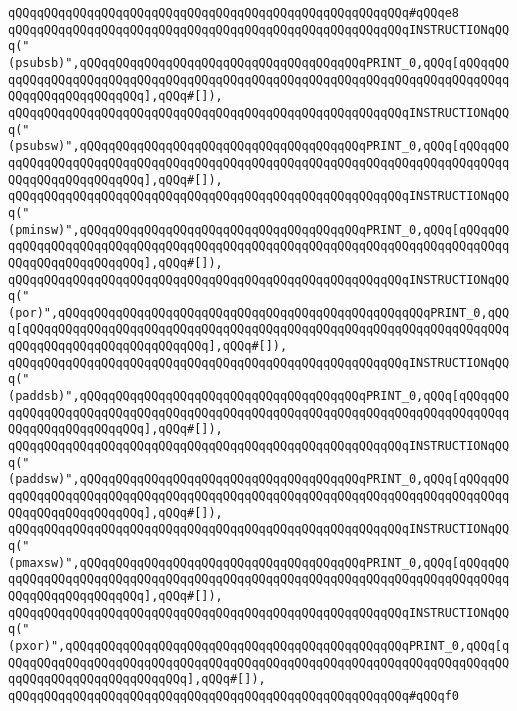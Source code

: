 \verb|qQQqqQQqqQQqqQQqqQQqqQQqqQQqqQQqqQQqqQQqqQQqqQQqqQQqqQQq#qQQqe8|\newline
\verb|qQQqqQQqqQQqqQQqqQQqqQQqqQQqqQQqqQQqqQQqqQQqqQQqqQQqqQQqINSTRUCTIONqQQq("(psubsb)",qQQqqQQqqQQqqQQqqQQqqQQqqQQqqQQqqQQqqQQqPRINT_0,qQQq[qQQqqQQqqQQqqQQqqQQqqQQqqQQqqQQqqQQqqQQqqQQqqQQqqQQqqQQqqQQqqQQqqQQqqQQqqQQqqQQqqQQqqQQqqQQqqQQq],qQQq#[]),|\newline
\verb|qQQqqQQqqQQqqQQqqQQqqQQqqQQqqQQqqQQqqQQqqQQqqQQqqQQqqQQqINSTRUCTIONqQQq("(psubsw)",qQQqqQQqqQQqqQQqqQQqqQQqqQQqqQQqqQQqqQQqPRINT_0,qQQq[qQQqqQQqqQQqqQQqqQQqqQQqqQQqqQQqqQQqqQQqqQQqqQQqqQQqqQQqqQQqqQQqqQQqqQQqqQQqqQQqqQQqqQQqqQQqqQQq],qQQq#[]),|\newline
\verb|qQQqqQQqqQQqqQQqqQQqqQQqqQQqqQQqqQQqqQQqqQQqqQQqqQQqqQQqINSTRUCTIONqQQq("(pminsw)",qQQqqQQqqQQqqQQqqQQqqQQqqQQqqQQqqQQqqQQqPRINT_0,qQQq[qQQqqQQqqQQqqQQqqQQqqQQqqQQqqQQqqQQqqQQqqQQqqQQqqQQqqQQqqQQqqQQqqQQqqQQqqQQqqQQqqQQqqQQqqQQqqQQq],qQQq#[]),|\newline
\verb|qQQqqQQqqQQqqQQqqQQqqQQqqQQqqQQqqQQqqQQqqQQqqQQqqQQqqQQqINSTRUCTIONqQQq("(por)",qQQqqQQqqQQqqQQqqQQqqQQqqQQqqQQqqQQqqQQqqQQqqQQqqQQqPRINT_0,qQQq[qQQqqQQqqQQqqQQqqQQqqQQqqQQqqQQqqQQqqQQqqQQqqQQqqQQqqQQqqQQqqQQqqQQqqQQqqQQqqQQqqQQqqQQqqQQqqQQq],qQQq#[]),|\newline
\verb|qQQqqQQqqQQqqQQqqQQqqQQqqQQqqQQqqQQqqQQqqQQqqQQqqQQqqQQqINSTRUCTIONqQQq("(paddsb)",qQQqqQQqqQQqqQQqqQQqqQQqqQQqqQQqqQQqqQQqPRINT_0,qQQq[qQQqqQQqqQQqqQQqqQQqqQQqqQQqqQQqqQQqqQQqqQQqqQQqqQQqqQQqqQQqqQQqqQQqqQQqqQQqqQQqqQQqqQQqqQQqqQQq],qQQq#[]),|\newline
\verb|qQQqqQQqqQQqqQQqqQQqqQQqqQQqqQQqqQQqqQQqqQQqqQQqqQQqqQQqINSTRUCTIONqQQq("(paddsw)",qQQqqQQqqQQqqQQqqQQqqQQqqQQqqQQqqQQqqQQqPRINT_0,qQQq[qQQqqQQqqQQqqQQqqQQqqQQqqQQqqQQqqQQqqQQqqQQqqQQqqQQqqQQqqQQqqQQqqQQqqQQqqQQqqQQqqQQqqQQqqQQqqQQq],qQQq#[]),|\newline
\verb|qQQqqQQqqQQqqQQqqQQqqQQqqQQqqQQqqQQqqQQqqQQqqQQqqQQqqQQqINSTRUCTIONqQQq("(pmaxsw)",qQQqqQQqqQQqqQQqqQQqqQQqqQQqqQQqqQQqqQQqPRINT_0,qQQq[qQQqqQQqqQQqqQQqqQQqqQQqqQQqqQQqqQQqqQQqqQQqqQQqqQQqqQQqqQQqqQQqqQQqqQQqqQQqqQQqqQQqqQQqqQQqqQQq],qQQq#[]),|\newline
\verb|qQQqqQQqqQQqqQQqqQQqqQQqqQQqqQQqqQQqqQQqqQQqqQQqqQQqqQQqINSTRUCTIONqQQq("(pxor)",qQQqqQQqqQQqqQQqqQQqqQQqqQQqqQQqqQQqqQQqqQQqqQQqPRINT_0,qQQq[qQQqqQQqqQQqqQQqqQQqqQQqqQQqqQQqqQQqqQQqqQQqqQQqqQQqqQQqqQQqqQQqqQQqqQQqqQQqqQQqqQQqqQQqqQQqqQQq],qQQq#[]),|\newline
\verb|qQQqqQQqqQQqqQQqqQQqqQQqqQQqqQQqqQQqqQQqqQQqqQQqqQQqqQQq#qQQqf0|\newline
